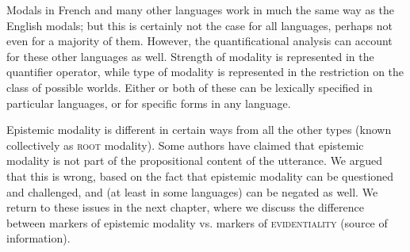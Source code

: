 Modals in French and many other languages work in much the same way as the English modals; but this is certainly not the case for all languages, perhaps not even for a majority of them. However, the quantificational analysis can account for these other languages as well. Strength of modality is represented in the quantifier operator, while type of modality is represented in the restriction on the class of possible worlds. Either or both of these can be lexically specified in particular languages, or for specific forms in any language.



Epistemic modality is different in certain ways from all the other types (known collectively as \textsc{root} modality). Some authors have claimed that epistemic modality is not part of the propositional content of the utterance. We argued that this is wrong, based on the fact that epistemic modality can be questioned and challenged, and (at least in some languages) can be negated as well. We return to these issues in the next chapter, where we discuss the difference between markers of epistemic modality vs. markers of \textsc{evidentiality} (source of information).




